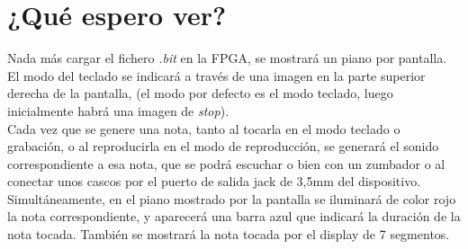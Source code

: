 \documentclass{article}
\begin{document}
\section{¿Qué espero ver?}

	Nada más cargar el fichero {\itshape .bit} en la FPGA, se mostrará un piano por pantalla. El modo del teclado se indicará a través de una imagen en la parte superior derecha de la pantalla, (el modo por defecto es el modo teclado, luego inicialmente habrá una imagen de {\itshape stop}).\\

	Cada vez que se genere una nota, tanto al tocarla en el modo teclado o grabación, o al reproducirla en el modo de reproducción, se generará el sonido correspondiente a esa nota, que se podrá escuchar o bien con un zumbador o al conectar unos cascos por el puerto de salida jack de 3,5mm del dispositivo. Simultáneamente, en el piano mostrado por la pantalla se iluminará de color rojo la nota correspondiente, y aparecerá una barra azul que indicará la duración de la nota tocada. También se mostrará la nota tocada por el display de 7 segmentos.\\
\end{document}

